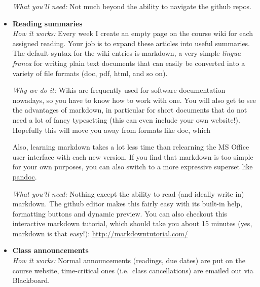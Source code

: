 \begin{itemize}
        \emph{What you'll need:}
        Not much beyond the ability to navigate the github repos.

    \item \textbf{Reading summaries}\\
        \emph{How it works:}
        Every week I create an empty page on the course wiki for each assigned reading.
        Your job is to expand these articles into useful summaries.
        The default syntax for the wiki entries is markdown, a very simple \emph{lingua franca} for writing plain text documents that can easily be converted into a variety of file formats (doc, pdf, html, and so on).

        \emph{Why we do it:}
        Wikis are frequently used for software documentation nowadays, so you have to know how to work with one.
        You will also get to see the advantages of markdown, in particular for short documents that do not need a lot of fancy typesetting (this can even include your own website!).
        Hopefully this will move you away from formats like doc, which
        Also, learning markdown takes a lot less time than relearning the MS Office user interface with each new version.
        If you find that markdown is too simple for your own purposes, you can also switch to a more expressive superset like \href{http://johnmacfarlane.net/pandoc/}{pandoc}.

        \emph{What you'll need:}
        Nothing except the ability to read (and ideally write in) markdown.
        The github editor makes this fairly easy with its built-in help, formatting buttons and dynamic preview.
        You can also checkout this interactive markdown tutorial, which should take you about 15 minutes (yes, markdown is that easy!):
        \href{http://markdowntutorial.com/}{http://markdowntutorial.com/}

    \item \textbf{Class announcements}\\
        \emph{How it works:}
        Normal announcements (readings, due dates) are put on the course website, time-critical ones (i.e.\ class cancellations) are emailed out via Blackboard.
        

\end{itemize}
